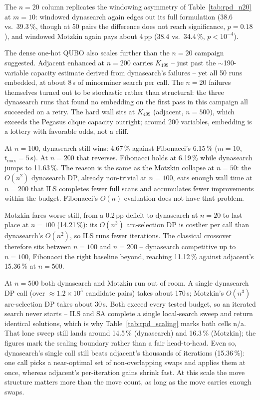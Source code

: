 \documentclass[preprint,12pt,authoryear]{elsarticle}
\begin{document}
The $n = 20$ column replicates the windowing asymmetry of
Table~\ref{tab:rpd_n20} at $m = 10$: windowed dynasearch again edges
out its full formulation (38.6 vs.\ 39.3\,\%, though at 50 pairs the
difference does not reach significance, $p = 0.18$), and windowed
Motzkin again pays about 4\,pp (38.4 vs.\ 34.4\,\%, $p < 10^{-4}$).

The dense one-hot QUBO also scales further than the $n = 20$ campaign
suggested. Adjacent enhanced at $n = 200$ carries $K_{199}$ -- just
past the $\sim$190-variable capacity estimate derived from
dynasearch's failures -- yet all 50 runs embedded, at about 8\,s of
minorminer search per call. The $n = 20$ failures themselves turned
out to be stochastic rather than structural: the three dynasearch
runs that found no embedding on the first pass in this campaign all
succeeded on a retry. The hard wall sits at $K_{499}$ (adjacent,
$n = 500$), which exceeds the Pegasus clique capacity outright;
around 200 variables, embedding is a lottery with favorable odds,
not a cliff.

At $n = 100$, dynasearch still wins: 4.67\,\% against Fibonacci's
6.15\,\% ($m = 10$, $t_{\max} = 5$\,s). At $n = 200$ that reverses.
Fibonacci holds at 6.19\,\% while dynasearch jumps to 11.63\,\%.
The reason is the same as the Motzkin collapse at $n = 50$: the
$O(n^2)$ dynasearch DP, already non-trivial at $n = 100$, eats enough
wall time at $n = 200$ that ILS completes fewer full scans and
accumulates fewer improvements within the budget. Fibonacci's $O(n)$
evaluation does not have that problem.

Motzkin fares worse still, from a 0.2\,pp deficit to dynasearch at
$n = 20$ to last place at $n = 100$ (14.21\,\%): its $O(n^3)$
arc-selection DP is costlier per call than dynasearch's $O(n^2)$, so
ILS runs fewer iterations. The classical crossover therefore sits
between $n = 100$ and $n = 200$ -- dynasearch competitive up to
$n = 100$, Fibonacci the right baseline beyond, reaching 11.12\,\%
against adjacent's 15.36\,\% at $n = 500$.

At $n = 500$ both dynasearch and Motzkin run out of room. A single
dynasearch DP call (over $\approx 1.2 \times 10^5$ candidate pairs)
takes about 170\,s; Motzkin's $O(n^3)$ arc-selection DP takes about
30\,s. Both exceed every tested budget, so an iterated search never
starts -- ILS and SA complete a single local-search sweep and return
identical solutions, which is why Table~\ref{tab:rpd_scaling} marks
both cells n/a. That lone sweep still lands around 14.5\,\%
(dynasearch) and 16.3\,\% (Motzkin); the figures mark the scaling
boundary rather than a fair head-to-head. Even so,
dynasearch's single call still beats adjacent's thousands of
iterations (15.36\,\%): one call picks a near-optimal set of
non-overlapping swaps and applies them at once, whereas adjacent's
per-iteration gains shrink fast. At this scale the move structure
matters more than the move count, as long as the move carries enough
swaps.
\end{document}
